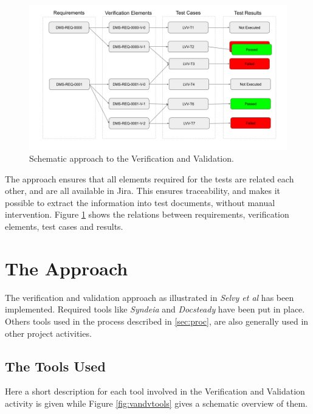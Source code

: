 \begin{figure}
\begin{center}
\includegraphics[width=\textwidth]{imgs/VandVSchema.png}
 \caption{Schematic approach to the Verification and Validation.}
 \label{fig:vandvschema}
\end{center}
\end{figure}

The approach ensures that all elements required for the tests are related each other, and are all available in Jira.
This ensures traceability, and makes it possible to extract the information into test documents, without manual intervention.
Figure \ref{fig:vandvschema} shows the relations between requirements, verification elements, test cases and results.


\section{The Approach}

The verification and validation approach as illustrated in  \textit{Selvy et al}\cite{10.1117/12.2310125}  has been implemented.
Required tools like \textit{Syndeia} and \textit{Docsteady} have been put in place.
Others tools used in the process described in \ref{sec:proc}, are also generally used in other project activities.


\subsection{The Tools Used}

Here a short description for each tool involved in the Verification and Validation activity is given while
Figure \ref{fig:vandvtools} gives a schematic overview of them.

